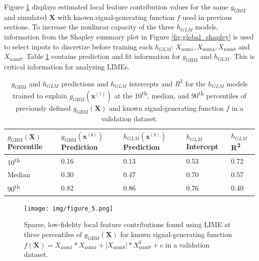 \documentclass[sigconf, review]{acmart}
\begin{document}
Figure \ref{fig:lime} displays estimated local feature contribution values for the same $g_{\text{GBM}}$ and simulated $\mathbf{X}$ with known signal-generating function $f$ used in previous sections. To increase the nonlinear capacity of the three $h_{GLM}$ models, information from the Shapley summary plot in Figure \ref{fig:global_shapley} is used to select inputs to discretize before training each $h_{GLM}$: $X_{\text{num}1}, X_{\text{num}4}, X_{\text{num}8}$ and $X_{\text{num}9}$. Table \ref{tab:lime} contains prediction and fit information for $g_{\text{GBM}}$ and $h_{\text{GLM}}$. This is critical information for analyzing LIMEs.

\begin{table}[ht]
	\centering
	\caption{$g_{\text{GBM}}$ and $h_{GLM}$ predictions and $h_{GLM}$ intercepts and $R^2$ for the $h_{GLM}$ models trained to explain $g_{\text{GBM}}(\mathbf{x}^{(i)})$ at the 10\textsuperscript{th}, median, and 90\textsuperscript{th} percentiles of previously defined $g_{\text{GBM}}(\mathbf{X})$ and known signal-generating function $f$ in a validation dataset.} 
	\begin{tabular}{ | p{1.5cm} | p{1.5cm} | p{1.5cm} | p{1.5cm}| p{0.7cm} | }
	\hline
	$g_{\text{GBM}}(\mathbf{X})$\newline Percentile & $g_{\text{GBM}}(\mathbf{x^{(i)}})$\newline Prediction & $h_{GLM}(\mathbf{x^{(i)}})$\newline Prediction & $h_{GLM}$\newline Intercept & $h_{GLM}$ R\textsuperscript{2} \\ 
	\hline
	10\textsuperscript{th} & 0.16 & 0.13 & 0.53 & 0.72\\
	\hline	
	Median & 0.30 & 0.47 & 0.70 & 0.57\\
	\hline	
	90\textsuperscript{th} & 0.82 & 0.86 & 0.76 & 0.40\\
	\hline
	\end{tabular}
	\label{tab:lime}
\end{table}	

\begin{figure}[htb]
	\begin{center}
		\texttt{[image: img/figure\_5.png]}
		\caption{Sparse, low-fidelity local feature contributions found using LIME at three percentiles of $g_{\text{GBM}}(\mathbf{X})$ for known signal-generating function $f(\mathbf{X}) = X_{\text{num}1} * X_{\text{num}4} + |X_{\text{num}8}| * X_{\text{num}9}^2 + e$ in a validation dataset.}
		\label{fig:lime}
	\end{center}
\end{figure}
\end{document}
